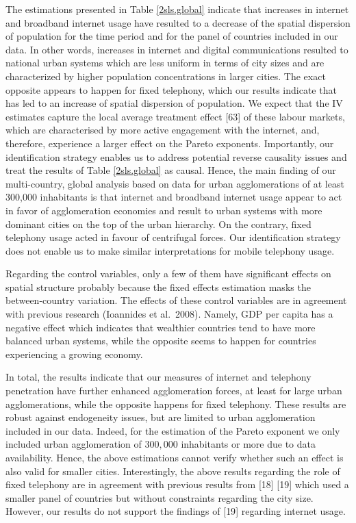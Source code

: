 \documentclass[10pt,letterpaper]{article}
\begin{document}
The estimations presented in Table \ref{2sls.global} indicate that
increases in internet and broadband internet usage have resulted to a
decrease of the spatial dispersion of population for the time period and
for the panel of countries included in our data. In other words,
increases in internet and digital communications resulted to national
urban systems which are less uniform in terms of city sizes and are
characterized by higher population concentrations in larger cities. The
exact opposite appears to happen for fixed telephony, which our results
indicate that has led to an increase of spatial dispersion of
population. We expect that the IV estimates capture the local average
treatment effect {[}63{]} of these labour markets, which are
characterised by more active engagement with the internet, and,
therefore, experience a larger effect on the Pareto exponents.
\color{black} Importantly, our identification strategy enables us to
address potential reverse causality issues and treat the results of
Table \ref{2sls.global} as causal. Hence, the main finding of our
multi-country, global analysis based on data for urban agglomerations of
at least 300,000 inhabitants is that internet and broadband internet
usage appear to act in favor of agglomeration economies and result to
urban systems with more dominant cities on the top of the urban
hierarchy. On the contrary, fixed telephony usage acted in favour of
centrifugal forces. Our identification strategy does not enable us to
make similar interpretations for mobile telephony usage.

Regarding the control variables, only a few of them have significant
effects on spatial structure probably because the fixed effects
estimation masks the between-country variation. The effects of these
control variables are in agreement with previous research (Ioannides et
al.~2008). Namely, GDP per capita has a negative effect which indicates
that wealthier countries tend to have more balanced urban systems, while
the opposite seems to happen for countries experiencing a growing
economy.

In total, the results indicate that our measures of internet and
telephony penetration have further enhanced agglomeration forces, at
least for large urban agglomerations, while the opposite happens for
fixed telephony. These results are robust against endogeneity issues,
but are limited to urban agglomeration included in our data. Indeed, for
the estimation of the Pareto exponent \color{black} we only included
urban agglomeration of \(300,000\) inhabitants or more due to data
availability. Hence, the above estimations cannot verify whether such an
effect is also valid for smaller cities. Interestingly, the above
results regarding the role of fixed telephony are in agreement with
previous results from {[}18{]} {[}19{]} which used a smaller panel of
countries but without constraints regarding the city size. However, our
results do not support the findings of {[}19{]} regarding internet
usage.
\end{document}
